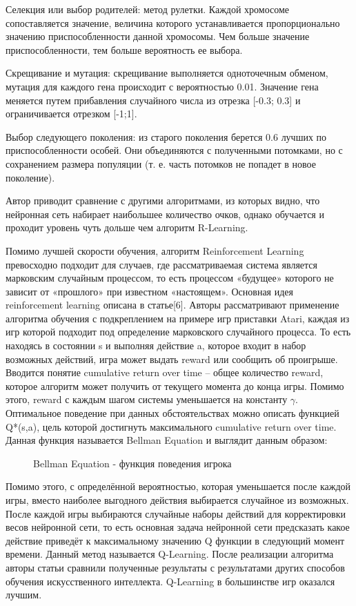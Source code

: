 \begin{Large}
Селекция или выбор родителей: метод рулетки. Каждой хромосоме сопоставляется значение, величина которого устанавливается пропорционально значению приспособленности данной хромосомы. Чем больше значение приспособленности, тем больше вероятность ее выбора.

Скрещивание и мутация: скрещивание выполняется одноточечным обменом, мутация для каждого гена происходит с вероятностью 0.01. Значение гена меняется путем прибавления случайного числа из отрезка [-0.3; 0.3] и ограничивается отрезком [-1;1].

Выбор следующего поколения: из старого поколения берется 0.6 лучших по приспособленности особей. Они объединяются с полученными потомками, но с сохранением размера популяции (т. е. часть потомков не попадет в новое поколение).

Автор приводит сравнение с другими алгоритмами, из которых видно, что нейронная сеть набирает наибольшее количество очков, однако обучается и проходит уровень чуть дольше чем алгоритм R-Learning.

Помимо лучшей скорости обучения, алгоритм Reinforcement Learning превосходно подходит для случаев, где рассматриваемая система является марковским случайным процессом, то есть процессом «будущее» которого не зависит от «прошлого» при известном «настоящем». Основная идея reinforcement learning описана в статье[6]. Авторы рассматривают применение алгоритма обучения с подкреплением на примере игр приставки Atari, каждая из игр которой подходит под определение марковского случайного процесса. То есть находясь в состоянии s и выполняя действие a, которое входит в набор возможных действий, игра может выдать reward или сообщить об проигрыше. Вводится понятие cumulative return over time – общее количество reward, которое алгоритм может получить от текущего момента до конца игры. Помимо этого, reward с каждым шагом системы уменьшается на константу $\gamma$. Оптимальное поведение при данных обстоятельствах можно описать функцией Q*(s,a), цель которой достигнуть максимального cumulative return over time. Данная функция называется Bellman Equation и выглядит данным образом:
\begin{figure}[h]
    \caption{Bellman Equation - функция поведения игрока}
\end{figure}

Помимо этого, с определённой вероятностью, которая уменьшается после каждой игры, вместо наиболее выгодного действия выбирается случайное из возможных. После каждой игры выбираются случайные наборы действий для корректировки весов нейронной сети, то есть основная задача нейронной сети предсказать какое действие приведёт к максимальному значению Q функции в следующий момент времени. Данный метод называется Q-Learning. После реализации алгоритма авторы статьи сравнили полученные результаты с результатами других способов обучения искусственного интеллекта. Q-Learning в большинстве игр оказался лучшим.

\end{Large}
